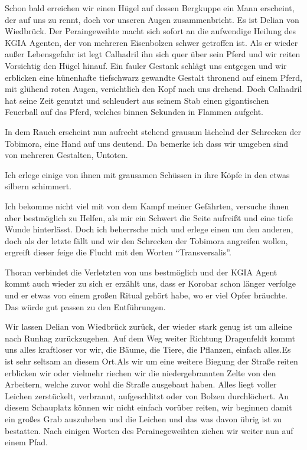 Schon bald erreichen wir einen Hügel auf dessen Bergkuppe ein Mann erscheint, der auf uns zu rennt, doch vor unseren Augen zusammenbricht. Es ist Delian von Wiedbrück. Der Peraingeweihte macht sich sofort an die aufwendige Heilung des KGIA Agenten, der von mehreren Eisenbolzen schwer getroffen ist. Als er wieder außer Lebensgefahr ist legt Calhadril ihn sich quer über sein Pferd und wir reiten Vorsichtig den Hügel hinauf. Ein fauler Gestank schlägt uns entgegen und wir erblicken eine hünenhafte tiefschwarz gewandte Gestalt thronend auf einem Pferd, mit glühend roten Augen, verächtlich den Kopf nach uns drehend. Doch Calhadril hat seine Zeit genutzt und schleudert aus seinem Stab einen gigantischen Feuerball auf das Pferd, welches binnen Sekunden in Flammen aufgeht.

In dem Rauch erscheint nun aufrecht stehend grausam lächelnd der Schrecken der Tobimora, eine Hand auf uns deutend. Da bemerke ich dass wir umgeben sind von mehreren Gestalten, Untoten.

Ich erlege einige von ihnen mit grausamen Schüssen in ihre Köpfe in den etwas silbern schimmert.

Ich bekomme nicht viel mit von dem Kampf meiner Gefährten, versuche ihnen aber bestmöglich zu Helfen, als mir ein Schwert die Seite aufreißt und eine tiefe Wunde hinterlässt. Doch ich beherrsche mich und erlege einen um den anderen, doch als der letzte fällt und wir den Schrecken der Tobimora angreifen wollen, ergreift dieser feige die Flucht mit den Worten ``Transversalis''.

Thoran verbindet die Verletzten von uns bestmöglich und der KGIA Agent kommt auch wieder zu sich er erzählt uns, dass er Korobar schon länger verfolge und er etwas von einem großen Ritual gehört habe, wo er viel Opfer bräuchte. Das würde gut passen zu den Entführungen.

Wir lassen Delian von Wiedbrück zurück, der wieder stark genug ist um alleine nach Runhag zurückzugehen.
Auf dem Weg weiter Richtung Dragenfeldt  kommt uns alles kraftloser vor wir, die Bäume, die Tiere, die Pflanzen, einfach alles.Es ist sehr seltsam an diesem Ort.Als wir um eine weitere Biegung der Straße reiten erblicken wir oder vielmehr riechen wir die niedergebrannten Zelte von den Arbeitern, welche zuvor wohl die Straße ausgebaut haben. Alles liegt voller Leichen zerstückelt, verbrannt, aufgeschlitzt oder von Bolzen durchlöchert. An diesem Schauplatz können wir nicht einfach vorüber reiten, wir beginnen damit ein großes Grab auszuheben und die Leichen und das was davon übrig ist zu bestatten. Nach einigen Worten des Perainegeweihten ziehen wir weiter nun auf einem Pfad.

